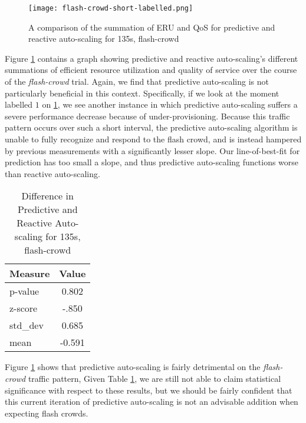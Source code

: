 \begin{figure}[!h]
  \centerline{\texttt{[image: flash-crowd-short-labelled.png]}}
  \caption{A comparison of the summation of ERU and QoS for
    predictive and reactive auto-scaling for 135s, flash-crowd}
  \label{fig:135s-flash-crowd-labelled}
\end{figure}

Figure \ref{fig:135s-flash-crowd-labelled} contains a graph
showing predictive and reactive auto-scaling's different
summations of efficient resource utilization and quality of service over the
course of the \textit{flash-crowd} trial. Again,
we find that predictive auto-scaling is not particularly
beneficial in this context. Specifically, if we look at the moment labelled
$1$ on \ref{fig:135s-flash-crowd-labelled}, we see another instance in which
predictive auto-scaling suffers a severe performance decrease because of
under-provisioning. Because this traffic pattern occurs over such a short
interval, the predictive auto-scaling algorithm is unable to fully recognize and
respond to the flash crowd, and is instead hampered by previous measurements
with a significantly lesser slope. Our line-of-best-fit for prediction has too
small a slope, and thus predictive auto-scaling functions worse than reactive
auto-scaling.

\begin{table}[htbp]
  \centering
  \caption{Difference in Predictive and Reactive Auto-scaling for 135s, flash-crowd}
  \label{tab:135s-flash-crowd}
\begin{tabular}{l c}\hline\hline
    \multicolumn{1}{c}{\textbf{Measure}} & \textbf{Value} \\ \hline
     p-value & 0.802 \\
     z-score & -.850 \\
     std\_dev & 0.685 \\
     mean & -0.591
  \end{tabular}
\end{table}

Figure \ref{fig:135s-flash-crowd-labelled} shows that predictive
auto-scaling is fairly detrimental on the \textit{flash-crowd} traffic pattern,
Given Table \ref{tab:135s-flash-crowd}, we are still not able to claim
statistical significance with respect to these results, but we should be fairly
confident that this current iteration of predictive auto-scaling is not an advisable addition
when expecting flash crowds.
